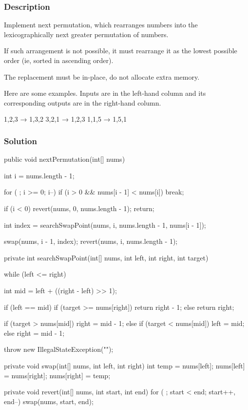 \subsubsection{Description}
Implement next permutation, which rearranges numbers into the lexicographically next greater permutation of numbers.

If such arrangement is not possible, it must rearrange it as the lowest possible order (ie, sorted in ascending order).

The replacement must be in-place, do not allocate extra memory.

Here are some examples. Inputs are in the left-hand column and its corresponding outputs are in the right-hand column.
\begin{Code}
1,2,3 → 1,3,2
3,2,1 → 1,2,3
1,1,5 → 1,5,1
\end{Code}

\subsubsection{Solution}

\begin{Code}
public void nextPermutation(int[] nums) {
    int i = nums.length - 1;

    for ( ; i >= 0; i--) {
        if (i > 0 && nums[i - 1] < nums[i]) {
            break;
        }
    }

    if (i < 0) {
        revert(nums, 0, nums.length - 1);
        return;
    }

    int index = searchSwapPoint(nums, i, nums.length - 1, nums[i - 1]);

    swap(nums, i - 1, index);
    revert(nums, i, nums.length - 1);
}
\end{Code}

\newpage

\begin{Code}
private int searchSwapPoint(int[] nums, int left, int right, int target) {
    while (left <= right) {
        int mid = left + ((right - left) >> 1);

        if (left == mid) {
            if (target >= nums[right]) {
                return right - 1;
            } else {
                return right;
            }
        }

        if (target > nums[mid]) {
            right = mid - 1;
        } else if (target < nums[mid]) {
            left = mid;
        } else {
            right = mid - 1;
        }
    }

    throw new IllegalStateException("");
}

private void swap(int[] nums, int left, int right) {
    int temp = nums[left];
    nums[left] = nums[right];
    nums[right] = temp;
}

private void revert(int[] nums, int start, int end) {
    for ( ; start < end; start++, end--) {
        swap(nums, start, end);
    }
}
\end{Code}

